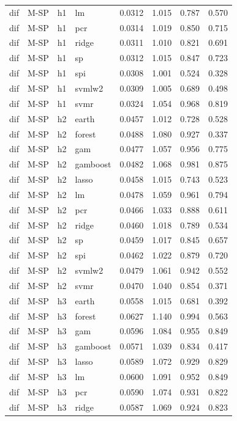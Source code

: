 \begin{ThreePartTable}
\begin{longtable}[t]{llclcccc}
dif & M-SP & h1 & lm & 0.0312 & 1.015 & 0.787 & 0.570\\
dif & M-SP & h1 & pcr & 0.0314 & 1.019 & 0.850 & 0.715\\
dif & M-SP & h1 & ridge & 0.0311 & 1.010 & 0.821 & 0.691\\
dif & M-SP & h1 & sp & 0.0312 & 1.015 & 0.847 & 0.723\\
dif & M-SP & h1 & spi & 0.0308 & 1.001 & 0.524 & 0.328\\
dif & M-SP & h1 & svmlw2 & 0.0309 & 1.005 & 0.689 & 0.498\\
dif & M-SP & h1 & svmr & 0.0324 & 1.054 & 0.968 & 0.819\\
\addlinespace
dif & M-SP & h2 & earth & 0.0457 & 1.012 & 0.728 & 0.528\\
dif & M-SP & h2 & forest & 0.0488 & 1.080 & 0.927 & 0.337\\
dif & M-SP & h2 & gam & 0.0477 & 1.057 & 0.956 & 0.775\\
dif & M-SP & h2 & gamboost & 0.0482 & 1.068 & 0.981 & 0.875\\
dif & M-SP & h2 & lasso & 0.0458 & 1.015 & 0.743 & 0.523\\
dif & M-SP & h2 & lm & 0.0478 & 1.059 & 0.961 & 0.794\\
dif & M-SP & h2 & pcr & 0.0466 & 1.033 & 0.888 & 0.611\\
dif & M-SP & h2 & ridge & 0.0460 & 1.018 & 0.789 & 0.534\\
dif & M-SP & h2 & sp & 0.0459 & 1.017 & 0.845 & 0.657\\
dif & M-SP & h2 & spi & 0.0462 & 1.022 & 0.879 & 0.720\\
dif & M-SP & h2 & svmlw2 & 0.0479 & 1.061 & 0.942 & 0.552\\
dif & M-SP & h2 & svmr & 0.0470 & 1.040 & 0.854 & 0.371\\
\addlinespace
dif & M-SP & h3 & earth & 0.0558 & 1.015 & 0.681 & 0.392\\
dif & M-SP & h3 & forest & 0.0627 & 1.140 & 0.994 & 0.563\\
dif & M-SP & h3 & gam & 0.0596 & 1.084 & 0.955 & 0.849\\
dif & M-SP & h3 & gamboost & 0.0571 & 1.039 & 0.834 & 0.417\\
dif & M-SP & h3 & lasso & 0.0589 & 1.072 & 0.929 & 0.829\\
dif & M-SP & h3 & lm & 0.0600 & 1.091 & 0.952 & 0.849\\
dif & M-SP & h3 & pcr & 0.0590 & 1.074 & 0.931 & 0.822\\
dif & M-SP & h3 & ridge & 0.0587 & 1.069 & 0.924 & 0.823\\

\end{longtable}
\end{ThreePartTable}
